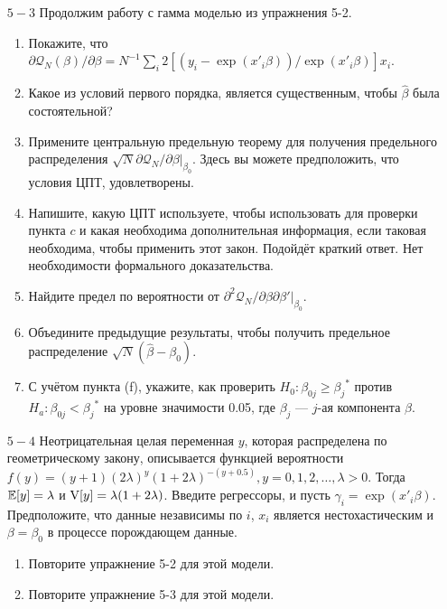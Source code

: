 \begin{enumerate}
\item [$5-3$] Продолжим работу с гамма моделью из упражнения 5-2.
\begin{enumerate}
\item Покажите, что $\partial \mathcal{Q}_{N}(\beta) / \partial \beta= N^{-1} \sum_i 2[(y_i-\exp(x'_i\beta))/\exp(x'_i\beta)]x_i$.
\item Какое из условий первого порядка, является существенным, чтобы $\hat{\beta}$ была состоятельной? 
\item Примените центральную предельную теорему для получения предельного распределения $\sqrt{N}\partial \mathcal{Q}_{N}/\partial \beta|_{\beta_0}$. Здесь вы можете предположить, что условия ЦПТ, удовлетворены.
\item Напишите, какую ЦПТ используете, чтобы использовать для проверки пункта $c$ и какая необходима дополнительная информация, если таковая необходима, чтобы применить этот закон. Подойдёт краткий ответ. Нет необходимости формального доказательства.
\item Найдите предел по вероятности от $\partial^2 \mathcal{Q}_{N}/\partial \beta \partial \beta'|_{\beta_0}$.
\item Объедините предыдущие результаты, чтобы получить предельное распределение $\sqrt{N}(\hat{\beta}-\beta_0)$.
\item С учётом пункта (f), укажите, как проверить $H_0: \beta_{0j} \geq {\beta_j}^*$ против $H_a: \beta_{0j} < {\beta_j}^*$ на уровне значимости 0.05, где $\beta_j$ --- $j$-ая компонента $\beta$.
\end{enumerate}

\item [$5-4$] Неотрицательная целая переменная $y$, которая распределена по геометрическому закону, описывается функцией вероятности $f(y)=(y+1)(2\lambda)^{y}(1+2\lambda)^{-(y+0.5)},y=0,1,2,\dots,\lambda>0$. Тогда $\mathbb{E}[y]=\lambda$ и $\mathrm{V}[y]=\lambda(1+2\lambda)$. Введите регрессоры, и пусть $\gamma_i=\exp(x'_i\beta)$. Предположите, что данные независимы по $i$, $x_i$ является нестохастическим и $\beta=\beta_0$ в процессе порождающем данные.
\begin{enumerate}
\item Повторите упражнение 5-2 для этой модели. 
\item Повторите упражнение 5-3 для этой модели.
\end{enumerate}


\end{enumerate}
